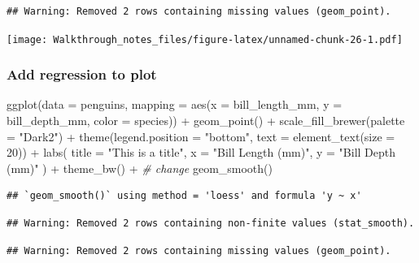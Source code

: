 \documentclass[
]{article}
\newenvironment{Shaded}{\begin{snugshade}}{\end{snugshade}}
\newcommand{\AttributeTok}[1]{\textcolor[rgb]{0.77,0.63,0.00}{#1}}
\newcommand{\CommentTok}[1]{\textcolor[rgb]{0.56,0.35,0.01}{\textit{#1}}}
\newcommand{\DecValTok}[1]{\textcolor[rgb]{0.00,0.00,0.81}{#1}}
\newcommand{\FunctionTok}[1]{\textcolor[rgb]{0.00,0.00,0.00}{#1}}
\newcommand{\NormalTok}[1]{#1}
\newcommand{\SpecialCharTok}[1]{\textcolor[rgb]{0.00,0.00,0.00}{#1}}
\newcommand{\StringTok}[1]{\textcolor[rgb]{0.31,0.60,0.02}{#1}}
\begin{document}
\begin{verbatim}
## Warning: Removed 2 rows containing missing values (geom_point).
\end{verbatim}

\texttt{[image: Walkthrough\_notes\_files/figure-latex/unnamed-chunk-26-1.pdf]}

\hypertarget{add-regression-to-plot}{%
\subsubsection{Add regression to plot}\label{add-regression-to-plot}}

\begin{Shaded}
\begin{Highlighting}[]
\FunctionTok{ggplot}\NormalTok{(}\AttributeTok{data =}\NormalTok{ penguins, }
       \AttributeTok{mapping =} \FunctionTok{aes}\NormalTok{(}\AttributeTok{x =}\NormalTok{ bill\_length\_mm, }
                     \AttributeTok{y =}\NormalTok{ bill\_depth\_mm, }
                     \AttributeTok{color =}\NormalTok{ species)) }\SpecialCharTok{+} 
  \FunctionTok{geom\_point}\NormalTok{() }\SpecialCharTok{+} 
  \FunctionTok{scale\_fill\_brewer}\NormalTok{(}\AttributeTok{palette =} \StringTok{"Dark2"}\NormalTok{) }\SpecialCharTok{+} 
  \FunctionTok{theme}\NormalTok{(}\AttributeTok{legend.position =} \StringTok{"bottom"}\NormalTok{, }
        \AttributeTok{text =} \FunctionTok{element\_text}\NormalTok{(}\AttributeTok{size =} \DecValTok{20}\NormalTok{)) }\SpecialCharTok{+} 
  \FunctionTok{labs}\NormalTok{(}
    \AttributeTok{title =} \StringTok{"This is a title"}\NormalTok{, }
    \AttributeTok{x =} \StringTok{"Bill Length (mm)"}\NormalTok{, }
    \AttributeTok{y =} \StringTok{"Bill Depth (mm)"}
\NormalTok{  ) }\SpecialCharTok{+} 
  \FunctionTok{theme\_bw}\NormalTok{() }\SpecialCharTok{+} 
\CommentTok{\# change  }
  \FunctionTok{geom\_smooth}\NormalTok{()}
\end{Highlighting}
\end{Shaded}

\begin{verbatim}
## `geom_smooth()` using method = 'loess' and formula 'y ~ x'
\end{verbatim}

\begin{verbatim}
## Warning: Removed 2 rows containing non-finite values (stat_smooth).
\end{verbatim}

\begin{verbatim}
## Warning: Removed 2 rows containing missing values (geom_point).
\end{verbatim}
\end{document}
